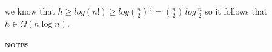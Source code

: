 \documentclass[a4paper]{article}
\begin{document}
\begin{multicols}{2}
\begin{framed}
\noindent
we know that $h \geq log(n!) \geq log (\frac{n}{2})^\frac{n}{2} = (\frac{n}{2})\, log \, \frac{n}{2}$ so it follows that $h \in \Omega(n \log n)$.
\end{framed}

\begin{framed}
\begin{center}
	\textbf{\textsc{notes}}
\end{center}
\vspace{109mm}
\end{framed}

\end{multicols}
\end{document}
